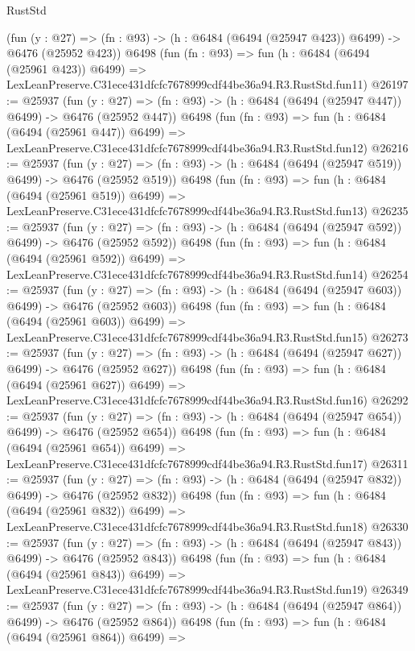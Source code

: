 \begin{lexlean}{RustStd}
\begin{coremodule}
    (fun (y : @27) => (fn : @93) -> (h : @6484 (@6494 (@25947 @423)) @6499) -> @6476 (@25952 @423))
    @6498
    (fun (fn : @93) =>
    fun (h : @6484 (@6494 (@25961 @423)) @6499) =>
    LexLeanPreserve.C31ece431dfcfc7678999cdf44be36a94.R3.RustStd.fun11)
@26197 := @25937
    (fun (y : @27) => (fn : @93) -> (h : @6484 (@6494 (@25947 @447)) @6499) -> @6476 (@25952 @447))
    @6498
    (fun (fn : @93) =>
    fun (h : @6484 (@6494 (@25961 @447)) @6499) =>
    LexLeanPreserve.C31ece431dfcfc7678999cdf44be36a94.R3.RustStd.fun12)
@26216 := @25937
    (fun (y : @27) => (fn : @93) -> (h : @6484 (@6494 (@25947 @519)) @6499) -> @6476 (@25952 @519))
    @6498
    (fun (fn : @93) =>
    fun (h : @6484 (@6494 (@25961 @519)) @6499) =>
    LexLeanPreserve.C31ece431dfcfc7678999cdf44be36a94.R3.RustStd.fun13)
@26235 := @25937
    (fun (y : @27) => (fn : @93) -> (h : @6484 (@6494 (@25947 @592)) @6499) -> @6476 (@25952 @592))
    @6498
    (fun (fn : @93) =>
    fun (h : @6484 (@6494 (@25961 @592)) @6499) =>
    LexLeanPreserve.C31ece431dfcfc7678999cdf44be36a94.R3.RustStd.fun14)
@26254 := @25937
    (fun (y : @27) => (fn : @93) -> (h : @6484 (@6494 (@25947 @603)) @6499) -> @6476 (@25952 @603))
    @6498
    (fun (fn : @93) =>
    fun (h : @6484 (@6494 (@25961 @603)) @6499) =>
    LexLeanPreserve.C31ece431dfcfc7678999cdf44be36a94.R3.RustStd.fun15)
@26273 := @25937
    (fun (y : @27) => (fn : @93) -> (h : @6484 (@6494 (@25947 @627)) @6499) -> @6476 (@25952 @627))
    @6498
    (fun (fn : @93) =>
    fun (h : @6484 (@6494 (@25961 @627)) @6499) =>
    LexLeanPreserve.C31ece431dfcfc7678999cdf44be36a94.R3.RustStd.fun16)
@26292 := @25937
    (fun (y : @27) => (fn : @93) -> (h : @6484 (@6494 (@25947 @654)) @6499) -> @6476 (@25952 @654))
    @6498
    (fun (fn : @93) =>
    fun (h : @6484 (@6494 (@25961 @654)) @6499) =>
    LexLeanPreserve.C31ece431dfcfc7678999cdf44be36a94.R3.RustStd.fun17)
@26311 := @25937
    (fun (y : @27) => (fn : @93) -> (h : @6484 (@6494 (@25947 @832)) @6499) -> @6476 (@25952 @832))
    @6498
    (fun (fn : @93) =>
    fun (h : @6484 (@6494 (@25961 @832)) @6499) =>
    LexLeanPreserve.C31ece431dfcfc7678999cdf44be36a94.R3.RustStd.fun18)
@26330 := @25937
    (fun (y : @27) => (fn : @93) -> (h : @6484 (@6494 (@25947 @843)) @6499) -> @6476 (@25952 @843))
    @6498
    (fun (fn : @93) =>
    fun (h : @6484 (@6494 (@25961 @843)) @6499) =>
    LexLeanPreserve.C31ece431dfcfc7678999cdf44be36a94.R3.RustStd.fun19)
@26349 := @25937
    (fun (y : @27) => (fn : @93) -> (h : @6484 (@6494 (@25947 @864)) @6499) -> @6476 (@25952 @864))
    @6498
    (fun (fn : @93) =>
    fun (h : @6484 (@6494 (@25961 @864)) @6499) =>

\end{coremodule}
\end{lexlean}
